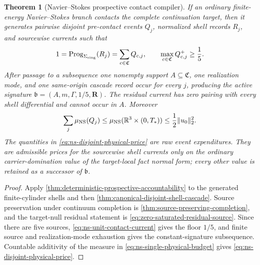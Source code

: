 \documentclass[11pt]{article}
\numberwithin{section}{part}
\theoremstyle{plain}
\newtheorem{theorem}{Theorem}[section]
\theoremstyle{definition}
\theoremstyle{remark}
\newcommand{\Channels}{\mathfrak C}
\begin{document}
\begin{theorem}[Navier--Stokes prospective contact compiler]
\label{thm:ns-prospective-contact-compiler}
If an ordinary finite-energy Navier--Stokes branch contacts the complete
continuation target, then it generates pairwise disjoint pre-contact events
\(Q_j\), normalized shell records \(R_j\), and sourcewise currents such that
\begin{equation}
 \label{eq:ns-unit-contact-current}
 1=\operatorname{Prog}_{\Sigma_{\rm sing}}(R_j)
  =\sum_{c\in\Channels}Q_{c,j},
 \qquad
 \max_{c\in\Channels}Q_{c,j}^{+}\ge\frac15.
\end{equation}
After passage to a subsequence one nonempty support
\(A\subseteq\Channels\), one realization mode, and one same-origin cascade
record occur for every \(j\), producing the active signature
\(\mathfrak b=(A,m,\Gamma,1/5,\mathbf R)\).  The residual current has
zero pairing with every shell differential and cannot occur in \(A\).
Moreover
\begin{equation}
 \label{eq:ns-disjoint-physical-price}
 \sum_j\mu_{\rm NS}(Q_j)
 \le \mu_{\rm NS}(\mathbb R^3\times(0,T_*))
 \le \frac12\|u_0\|_2^2.
\end{equation}
The quantities in \eqref{eq:ns-disjoint-physical-price} are raw event
expenditures.  They are admissible prices for the sourcewise shell currents
only on the ordinary carrier-domination value of the target-local fact
normal form; every other value is retained as a successor of
\(\mathfrak b\).
\end{theorem}

\begin{proof}
Apply \cref{thm:deterministic-prospective-accountability} to the generated
finite-cylinder shells and then
\cref{thm:canonical-disjoint-shell-cascade}.  Source preservation under
continuum completion is \cref{thm:source-preserving-completion}, and the
target-null residual statement is
\eqref{eq:zero-saturated-residual-source}.  Since there are five sources,
\eqref{eq:ns-unit-contact-current} gives the floor \(1/5\), and finite
source and realization-mode exhaustion gives the constant-signature
subsequence.  Countable
additivity of the measure in \eqref{eq:ns-single-physical-budget} gives
\eqref{eq:ns-disjoint-physical-price}.
\end{proof}
\end{document}
